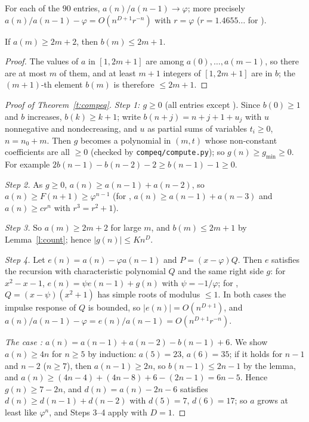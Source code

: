 \begin{theorem}\label{t:compeq} For each of the $90$ entries, $a(n)/a(n-1)\to\varphi$; more precisely
$a(n)/a(n-1)-\varphi=O(n^{D+1}r^{-n})$ with $r=\varphi$ ($r=1.4655\ldots$ for ).\end{theorem}
\begin{lemma}\label{l:count} If $a(m)\ge2m+2$, then $b(m)\le2m+1$.\end{lemma}
\begin{proof} The values of $a$ in $[1,2m+1]$ are among $a(0),\dots,a(m-1)$, so there are at most $m$ of them, and at
least $m+1$ integers of $[1,2m+1]$ are in $b$; the $(m+1)$-th element $b(m)$ is therefore $\le2m+1$. \end{proof}
\begin{proof}[Proof of Theorem~\ref{t:compeq}] \emph{Step 1: $g\ge0$} (all entries except ).
Since $b(0)\ge1$ and $b$ increases, $b(k)\ge k+1$; write $b(n+j)=n+j+1+u_j$ with $u$ nonnegative and nondecreasing,
and $u$ as partial sums of variables $t_i\ge0$, $n=n_0+m$. Then $g$ becomes a polynomial in $(m,t)$ whose
non-constant coefficients are all $\ge0$ (checked by \texttt{compeq/compute.py}); so $g(n)\ge g_{\min}\ge0$. For
example $2b(n-1)-b(n-2)-2\ge b(n-1)-1\ge0$.

\emph{Step 2.} As $g\ge0$, $a(n)\ge a(n-1)+a(n-2)$, so $a(n)\ge F(n+1)\ge\varphi^{n-1}$ (for ,
$a(n)\ge a(n-1)+a(n-3)$ and $a(n)\ge cr^n$ with $r^3=r^2+1$).

\emph{Step 3.} So $a(m)\ge2m+2$ for large $m$, and $b(m)\le2m+1$ by Lemma~\ref{l:count}; hence $|g(n)|\le Kn^D$.

\emph{Step 4.} Let $e(n)=a(n)-\varphi a(n-1)$ and $P=(x-\varphi)Q$. Then $e$ satisfies the recursion with
characteristic polynomial $Q$ and the same right side $g$: for $x^2-x-1$, $e(n)=\psi e(n-1)+g(n)$ with
$\psi=-1/\varphi$; for , $Q=(x-\psi)(x^2+1)$ has simple roots of modulus $\le1$. In both cases the
impulse response of $Q$ is bounded, so $|e(n)|=O(n^{D+1})$, and
$a(n)/a(n-1)-\varphi=e(n)/a(n-1)=O(n^{D+1}r^{-n})$.

\emph{The case : $a(n)=a(n-1)+a(n-2)-b(n-1)+6$.} We show $a(n)\ge4n$ for $n\ge5$ by induction:
$a(5)=23$, $a(6)=35$; if it holds for $n-1$ and $n-2$ ($n\ge7$), then $a(n-1)\ge2n$, so $b(n-1)\le2n-1$ by the lemma,
and $a(n)\ge(4n-4)+(4n-8)+6-(2n-1)=6n-5$. Hence $g(n)\ge7-2n$, and $d(n)=a(n)-2n-6$ satisfies
$d(n)\ge d(n-1)+d(n-2)$ with $d(5)=7$, $d(6)=17$; so $a$ grows at least like $\varphi^n$, and Steps 3--4 apply with
$D=1$. \end{proof}

